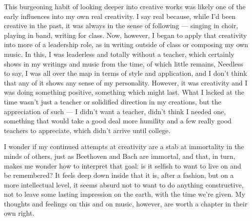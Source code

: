 This burgeoning habit of looking deeper into creative works was likely one of the early influences into my own real creativity. I say real because, while I'd been creative in the past, it was always in the sense of following --- singing in choir, playing in band, writing for class. Now, however, I began to apply that creativity into more of a leadership role, as in writing outside of class or composing my own music. In this, I was leaderless and totally without a teacher, which certainly shows in my writings and music from the time, of which little remains, Needless to say, I was all over the map in terms of style and application, and I don't think that any of it shows any sense of my personality. However, it was creativity and I was doing something positive, something which might last. What I lacked at the time wasn't just a teacher or solidified direction in my creations, but the appreciation of such --- I didn't want a teacher, didn't think I needed one, something that would take a good deal more humility and a few really good teachers to appreciate, which didn't arrive until college.

I wonder if my continued attempts at creativity are a stab at immortality in the minds of others, just as Beethoven and Bach are immortal, and that, in turn, makes me wonder how to interpret that goal: is it selfish to want to live on and be remembered? It feels deep down inside that it is, after a fashion, but on a more intellectual level, it seems absurd not to want to do anything constructive, not to leave some lasting impression on the earth, with the time we're given. My thoughts and feelings on this and on music, however, are worth a chapter in their own right.
